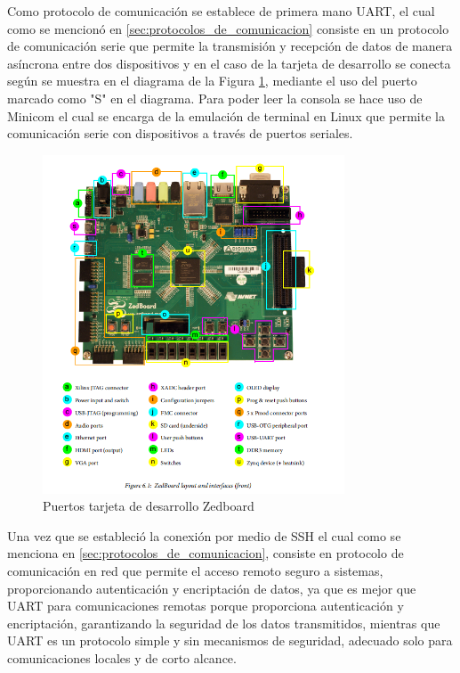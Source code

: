 Como protocolo de comunicación se establece de primera mano UART, el cual como se mencionó en \ref{sec:protocolos_de_comunicacion} consiste en un protocolo de comunicación serie que permite la transmisión y recepción de datos de manera asíncrona entre dos dispositivos y en el caso de la tarjeta de desarrollo se conecta según se muestra en el diagrama de la Figura \ref{fig:puertos_zedboard}, mediante el uso del puerto marcado como "S" en el diagrama. Para poder leer la consola se hace uso de Minicom el cual se encarga de la emulación de terminal en Linux que permite la comunicación serie con dispositivos a través de puertos seriales.

\begin{figure}[h!]
    \centering
    \includegraphics[width=0.8\textwidth]{fig/especifico_2/154140ZedBoard.png}
    \caption{Puertos tarjeta de desarrollo Zedboard}
    \label{fig:puertos_zedboard}
\end{figure}


Una vez que se estableció la conexión por medio de SSH el cual como se menciona en \ref{sec:protocolos_de_comunicacion}, consiste en protocolo de comunicación en red que permite el acceso remoto seguro a sistemas, proporcionando autenticación y encriptación de datos, ya que es mejor que UART para comunicaciones remotas porque proporciona autenticación y encriptación, garantizando la seguridad de los datos transmitidos, mientras que UART es un protocolo simple y sin mecanismos de seguridad, adecuado solo para comunicaciones locales y de corto alcance. 

